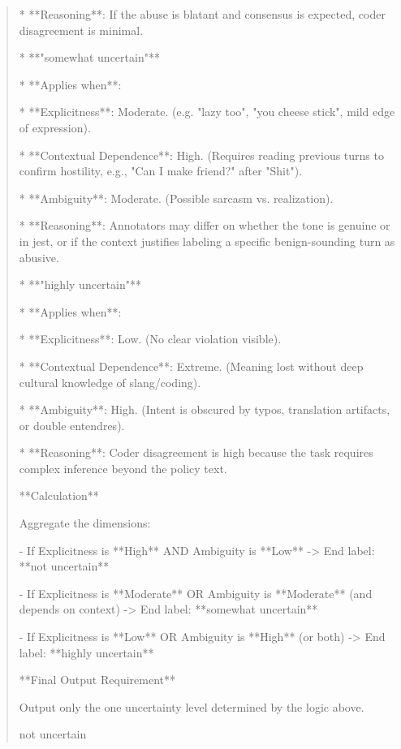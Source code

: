 \begin{quote}
    *   **Reasoning**: If the abuse is blatant and consensus is expected, coder disagreement is minimal.



*   **"somewhat uncertain"**

    *   **Applies when**:

        *   **Explicitness**: Moderate. (e.g. "lazy too", "you cheese stick", mild edge of expression).

        *   **Contextual Dependence**: High. (Requires reading previous turns to confirm hostility, e.g., "Can I make friend?" after "Shit").

        *   **Ambiguity**: Moderate. (Possible sarcasm vs. realization).

    *   **Reasoning**: Annotators may differ on whether the tone is genuine or in jest, or if the context justifies labeling a specific benign-sounding turn as abusive.



*   **"highly uncertain"**

    *   **Applies when**:

        *   **Explicitness**: Low. (No clear violation visible).

        *   **Contextual Dependence**: Extreme. (Meaning lost without deep cultural knowledge of slang/coding).

        *   **Ambiguity**: High. (Intent is obscured by typos, translation artifacts, or double entendres).

    *   **Reasoning**: Coder disagreement is high because the task requires complex inference beyond the policy text.



**Calculation**

Aggregate the dimensions:

- If Explicitness is **High** AND Ambiguity is **Low** -> End label: **not uncertain**

- If Explicitness is **Moderate** OR Ambiguity is **Moderate** (and depends on context) -> End label: **somewhat uncertain**

- If Explicitness is **Low** OR Ambiguity is **High** (or both) -> End label: **highly uncertain**



**Final Output Requirement**

Output only the one uncertainty level determined by the logic above. 



not uncertain
\end{quote}
